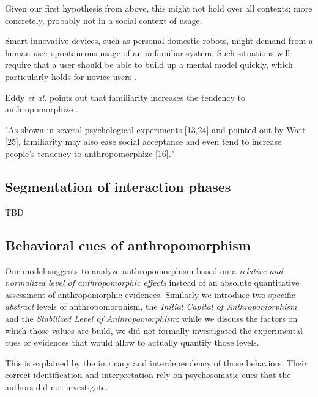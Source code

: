 \documentclass{acm_proc_article-sp}
\begin{document}
Given our first hypothesis from above, this might not hold over all contexts;
more concretely, probably not in a social context of usage.


Smart innovative devices, such as personal domestic robots, might demand from a
human user spontaneous usage of an unfamiliar system. Such situations will
require that a user should be able to build up a mental model quickly, which
particularly holds for novice users \cite{schmitz_concepts_2011}.

Eddy \textit{et al.} points out that familiarity increases the tendency to
anthropomorphize \cite{eddy_attribution_1993}.

"As shown in several psychological experiments [13,24] and pointed out by Watt
[25], familiarity may also ease social acceptance and even tend to increase
people's tendency to anthropomorphize [16]." \cite{duffy_anthropomorphism_2003}


\subsection{Segmentation of interaction phases}

TBD

\subsection{Behavioral cues of anthropomorphism}
\label{sec:behavioralcues}

Our model suggests to analyze anthropomorphism based on a \emph{relative and
normalized level of anthropomorphic effects} instead of an absolute
quantitative assessment of anthropomorphic evidences. Similarly we introduce
two specific \emph{abstract} levels of anthropomorphism, the \emph{Initial
Capital of Anthropomorphism} and the \emph{Stabilized Level of
Anthropomorphism}: while we discuss the factors on which those values are
build, we did not formally investigated the experimental cues or evidences
that would allow to actually quantify those levels.

This is explained by the intricacy and interdependency of those behaviors.
Their correct identification and interpretation rely on psychosomatic cues that
the authors did not investigate.
\end{document}
